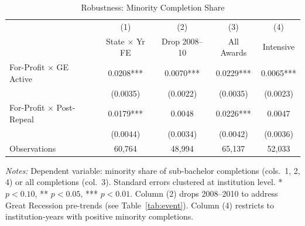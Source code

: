 \begin{table}[H]
\centering
\caption{Robustness: Minority Completion Share}
\label{tab:robustness}
\begin{threeparttable}
\begin{tabular}{lcccc}
\toprule
 & (1) & (2) & (3) & (4) \\
 & State $\times$ Yr FE & Drop 2008--10 & All Awards & Intensive \\
\midrule
For-Profit $\times$ GE Active & 0.0208*** & 0.0070*** & 0.0229*** & 0.0065*** \\
 & (0.0035) & (0.0022) & (0.0035) & (0.0023) \\
[0.5em]
For-Profit $\times$ Post-Repeal & 0.0179*** & 0.0048 & 0.0226*** & 0.0047 \\
 & (0.0044) & (0.0034) & (0.0042) & (0.0036) \\
\midrule
Observations & 60,764 & 48,994 & 65,137 & 52,033 \\
\bottomrule
\end{tabular}
\begin{tablenotes}[flushleft]
\small
\item \textit{Notes:} Dependent variable: minority share of sub-bachelor completions (cols.\ 1, 2, 4) or all completions (col.\ 3). Standard errors clustered at institution level. * $p<0.10$, ** $p<0.05$, *** $p<0.01$. Column (2) drops 2008--2010 to address Great Recession pre-trends (see Table~\ref{tab:event}). Column (4) restricts to institution-years with positive minority completions.
\end{tablenotes}
\end{threeparttable}
\end{table}
